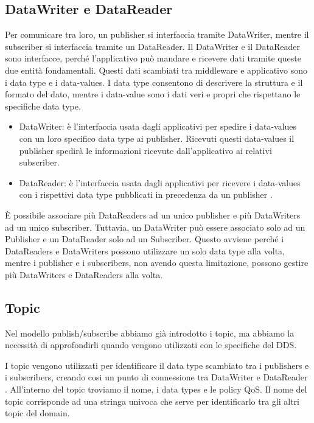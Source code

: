 \subsection{DataWriter e DataReader}

Per comunicare tra loro, un publisher si interfaccia tramite
DataWriter, 
mentre il subscriber si interfaccia tramite un DataReader.
Il DataWriter e il DataReader sono interfacce, 
perché l'applicativo
può mandare e ricevere dati
tramite queste due entità fondamentali. 
Questi dati scambiati tra middleware e applicativo
sono i data type e i data-values. I data type consentono di 
descrivere la struttura e il formato del dato, mentre i data-value
sono i dati veri e propri che rispettano le specifiche data type.
\begin{itemize}
    \item DataWriter: è l'interfaccia usata dagli applicativi 
    per spedire i
    data-values con un loro specifico data type ai publisher.
    Ricevuti questi data-values il publisher spedirà le
    informazioni ricevute dall'applicativo ai relativi subscriber.
    \item DataReader: è l'interfaccia usata dagli applicativi per
    ricevere i data-values con i rispettivi data type pubblicati in
    precedenza da un publisher \cite{dds1.4}.
\end{itemize}
È possibile
associare più DataReaders ad un unico publisher e più DataWriters ad
un unico subscriber. Tuttavia, un DataWriter può essere associato solo ad un 
Publisher e un DataReader solo ad un Subscriber. 
Questo avviene perché
i DataReaders e DataWriters possono utilizzare un solo data type alla volta, 
mentre 
i publisher e i subscribers, non avendo questa limitazione, possono gestire 
più DataWriters e DataReaders alla volta.


\subsection{Topic}
Nel modello publish/subscribe abbiamo già introdotto i topic, ma 
abbiamo la necessità di approfondirli quando vengono utilizzati
con le specifiche del DDS.

I topic vengono utilizzati per identificare il data type
scambiato tra i publishers e i subscribers, creando cosi un punto
di connessione 
tra DataWriter e DataReader \cite{topicomg}.
All'interno del topic troviamo il nome,
i data types e le policy QoS.
Il nome del topic corrisponde ad una stringa univoca 
che serve per identificarlo 
tra gli altri topic del domain.


